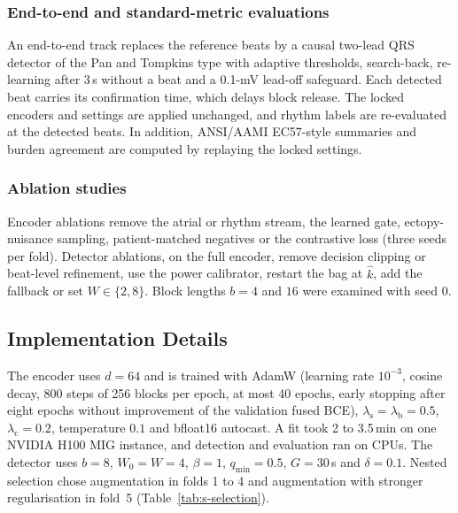 \documentclass[preprint,12pt]{elsarticle}
\newcommand{\1}{\mathbf{1}}
\begin{document}
\subsubsection{End-to-end and standard-metric evaluations}
An end-to-end track replaces the reference beats by a causal two-lead QRS detector of the Pan and Tompkins type \cite{pan1985} with adaptive thresholds, search-back, re-learning after 3\,s without a beat and a 0.1-mV lead-off safeguard. Each detected beat carries its confirmation time, which delays block release. The locked encoders and settings are applied unchanged, and rhythm labels are re-evaluated at the detected beats. In addition, ANSI/AAMI EC57-style summaries \cite{ec57} and burden agreement are computed by replaying the locked settings.

\subsubsection{Ablation studies}
Encoder ablations remove the atrial or rhythm stream, the learned gate, ectopy-nuisance sampling, patient-matched negatives or the contrastive loss (three seeds per fold). Detector ablations, on the full encoder, remove decision clipping or beat-level refinement, use the power calibrator, restart the bag at $\hat k$, add the fallback or set $W\in\{2,8\}$. Block lengths $b=4$ and $16$ were examined with seed 0.

\subsection{Implementation Details}
The encoder uses $d=64$ and is trained with AdamW (learning rate $10^{-3}$, cosine decay, 800 steps of 256 blocks per epoch, at most 40 epochs, early stopping after eight epochs without improvement of the validation fused BCE), $\lambda_{\mathrm s}=\lambda_{\mathrm b}=0.5$, $\lambda_{\mathrm c}=0.2$, temperature $0.1$ and bfloat16 autocast. A fit took 2 to 3.5\,min on one NVIDIA H100 MIG instance, and detection and evaluation ran on CPUs. The detector uses $b=8$, $W_0=W=4$, $\beta=1$, $q_{\min}=0.5$, $G=30$\,s and $\delta=0.1$. Nested selection chose augmentation in folds 1 to 4 and augmentation with stronger regularisation in fold~5 (Table~\ref{tab:s-selection}).


\end{document}
